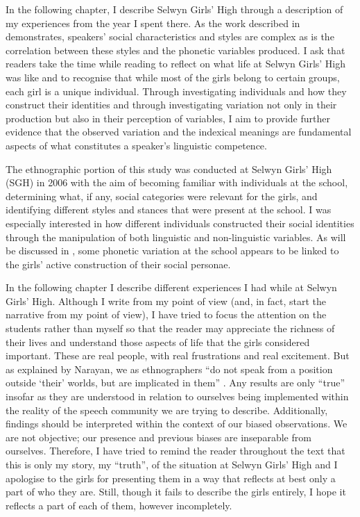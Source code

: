 In the following chapter, I describe Selwyn Girls' High through a description of my experiences from the year I spent there. As the work described in  demonstrates, speakers' social characteristics and styles are complex as is the correlation between these styles and the phonetic variables produced. I ask that readers take the time while reading  to reflect on what life at Selwyn Girls' High was like and to recognise that while most of the girls belong to certain groups, each girl is a unique individual. Through investigating individuals and how they construct their identities and through investigating variation not only in their production but also in their perception of variables, I aim to provide further evidence that the observed variation and the indexical meanings are fundamental aspects of what constitutes a speaker's linguistic competence.


The ethnographic portion of this study was conducted at Selwyn Girls' High (SGH) in 2006 with the aim of becoming familiar with individuals at the school, determining what, if any, social categories were relevant for the girls, and identifying different styles and stances that were present at the school. I was especially interested in how different individuals constructed their social identities through the manipulation of both linguistic and non-linguistic variables. As will be discussed in , some phonetic variation at the school appears to be linked to the girls' active construction of their social personae. 

In the following chapter I describe different experiences I had while at Selwyn Girls' High. Although I write from my point of view (and, in fact, start the narrative from my point of view), I have tried to focus the attention on the students rather than myself so that the reader may appreciate the richness of their lives and understand those aspects of life that the girls considered important. These are real people, with real frustrations and real excitement. But as explained by Narayan, we as ethnographers ``do not speak from a position outside `their' worlds, but are implicated in them'' \citet[676]{narayan1993}. Any results are only ``true'' insofar as they are understood in relation to ourselves being implemented within the reality of the speech community we are trying to describe. Additionally, findings should be interpreted within the context of our biased observations. We are not objective; our presence and previous biases are inseparable from ourselves. Therefore, I have tried to remind the reader throughout the text that this is only my story, my ``truth'', of the situation at Selwyn Girls' High and I apologise to the girls for presenting them in a way that reflects at best only a part of who they are. Still, though it fails to describe the girls entirely, I hope it reflects a part of each of them, however incompletely. 

